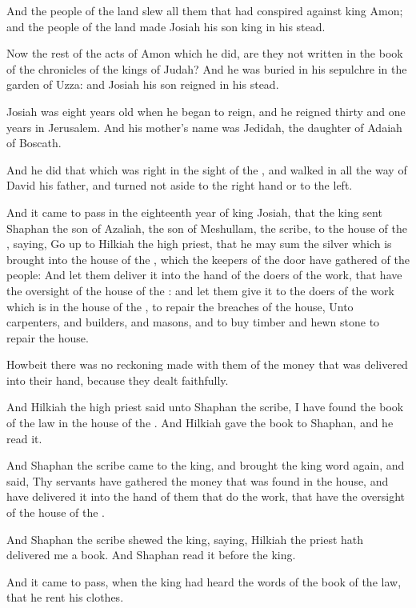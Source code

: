 \Verse And the people of the land slew all them that had conspired against king Amon; and the people of the land made Josiah his son king in his stead.

\Verse Now the rest of the acts of Amon which he did, are they not written in the book of the chronicles of the kings of Judah?  \Verse And he was buried in his sepulchre in the garden of Uzza: and Josiah his son reigned in his stead.


\Chapter
\Verse Josiah was eight years old when he began to reign, and he reigned thirty and one years in Jerusalem. And his mother's name was Jedidah, the daughter of Adaiah of Boscath.

\Verse And he did that which was right in the sight of the \LORD, and walked in all the way of David his father, and turned not aside to the right hand or to the left.

\Verse And it came to pass in the eighteenth year of king Josiah, that the king sent Shaphan the son of Azaliah, the son of Meshullam, the scribe, to the house of the \LORD, saying, \Verse Go up to Hilkiah the high priest, that he may sum the silver which is brought into the house of the \LORD, which the keepers of the door have gathered of the people: \Verse And let them deliver it into the hand of the doers of the work, that have the oversight of the house of the \LORD: and let them give it to the doers of the work which is in the house of the \LORD, to repair the breaches of the house, \Verse Unto carpenters, and builders, and masons, and to buy timber and hewn stone to repair the house.

\Verse Howbeit there was no reckoning made with them of the money that was delivered into their hand, because they dealt faithfully.

\Verse And Hilkiah the high priest said unto Shaphan the scribe, I have found the book of the law in the house of the \LORD. And Hilkiah gave the book to Shaphan, and he read it.

\Verse And Shaphan the scribe came to the king, and brought the king word again, and said, Thy servants have gathered the money that was found in the house, and have delivered it into the hand of them that do the work, that have the oversight of the house of the \LORD.

\Verse And Shaphan the scribe shewed the king, saying, Hilkiah the priest hath delivered me a book. And Shaphan read it before the king.

\Verse And it came to pass, when the king had heard the words of the book of the law, that he rent his clothes.

